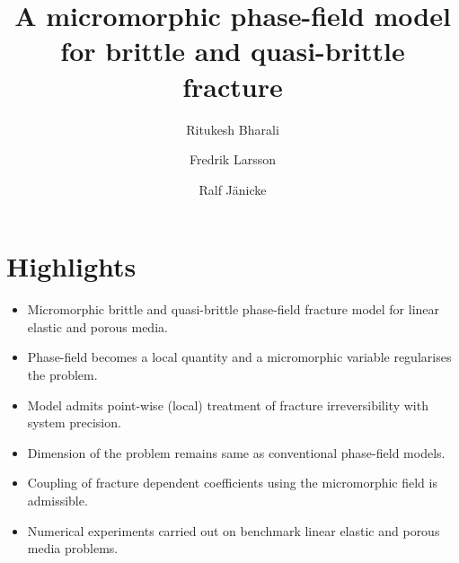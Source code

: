 \documentclass[11pt]{article}
\begin{document}
\title{A micromorphic phase-field model for brittle and quasi-brittle fracture }

\author[1]{Ritukesh Bharali}
\author[1]{Fredrik Larsson}
\author[2]{Ralf J\"anicke}

\date{}

\maketitle

\section*{Highlights}
\begin{itemize}
    \item Micromorphic brittle and quasi-brittle phase-field fracture model for linear elastic and porous media.
    \item Phase-field becomes a local quantity and a micromorphic variable regularises the problem.
    \item Model admits point-wise (local) treatment of fracture irreversibility with system precision.
    \item Dimension of the problem remains same as conventional phase-field models.
    \item Coupling of fracture dependent coefficients using the micromorphic field is admissible.
    \item Numerical experiments carried out on benchmark linear elastic and porous media problems.
\end{itemize}

\bigskip
\end{document}
